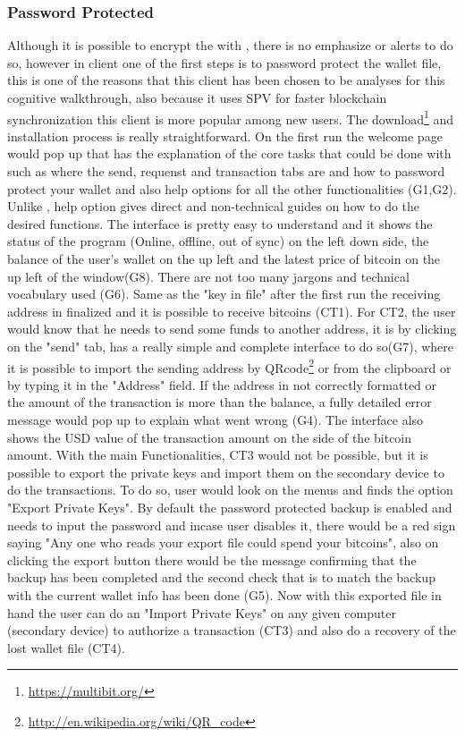 \subsubsection{Password Protected}
Although it is possible to encrypt the \walletfile with \bitcoinclient, there is no emphasize or alerts to do so, however in \multibit client one of the first steps is to password protect the wallet file, this is one of the reasons that this client has been chosen to be analyses for this cognitive walkthrough, also because it uses SPV for faster blockchain synchronization this client is more popular among new users.
The download\footnote{\url{https://multibit.org/}} and installation process is really straightforward. On the first run the welcome page would pop up that has the explanation of the core tasks that could be done with \multibit such as where the send, requenst and transaction tabs are and how to password protect your wallet and also help options for all the other functionalities (G1,G2). Unlike \bitcoinclient, \multibit help option gives direct and non-technical guides on how to do the desired functions. The interface is pretty easy to understand and it shows the status of the program (Online, offline, out of sync) on the left down side, the balance of the user's wallet on the up left and the latest price of bitcoin on the up left of the window(G8). There are not too many jargons and technical vocabulary used (G6). Same as the "key in file" after the first run the receiving address in finalized and it is possible to receive bitcoins (CT1). For CT2, the user would know that he needs to send some funds to another address, it is by clicking on the "send" tab, \multibit has a really simple and complete interface to do so(G7), where it is possible to import the sending address by QRcode\footnote{\url{http://en.wikipedia.org/wiki/QR_code}} or from the clipboard or by typing it in the "Address" field. If the address in not correctly formatted or the amount of the transaction is more than the balance, a fully detailed error message would pop up to explain what went wrong (G4). The interface also shows the USD value of the transaction amount on the side of the bitcoin amount. With the main Functionalities, CT3 would not be possible, but it is possible to export the private keys and import them on the secondary device to do the transactions. To do so, user would look on the menus and finds the option "Export Private Keys". By default the password protected backup is enabled and needs to input the password and incase user disables it, there would be a red sign saying "Any one who reads your export file could spend your bitcoins", also on clicking the export button there would be the message confirming that the backup has been completed and the second check that is to match the backup with the current wallet info has been done (G5). Now with this exported file in hand the user can do an "Import Private Keys" on any given computer (secondary device) to authorize a transaction (CT3) and also do a recovery of the lost wallet file (CT4).

